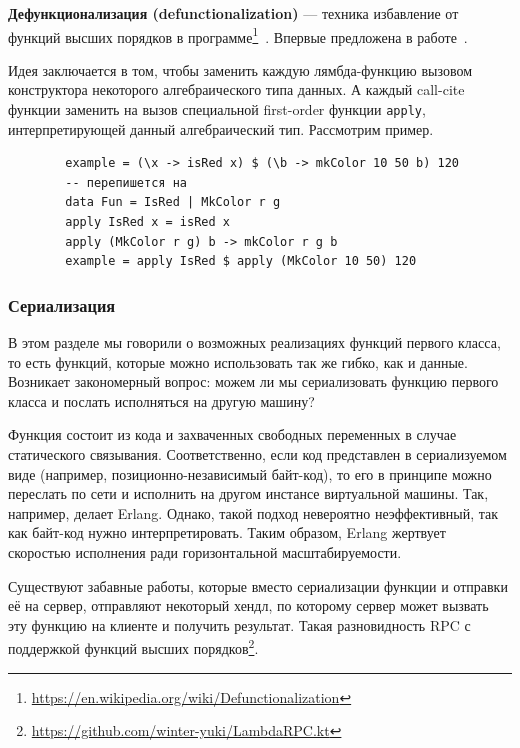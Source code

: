 \documentclass[12pt]{article}
\newcommand{\vocab}[1]{\textbf{#1}} %
\begin{document}
    \vocab{Дефункционализация (defunctionalization)} --- техника избавление от функций высших порядков в программе\footnote{\url{https://en.wikipedia.org/wiki/Defunctionalization}}~\cite{defunctionalization-slides}.
    Впервые предложена в работе~\cite{reynolds1972definitional, reynolds1998definitional}.

    Идея заключается в том, чтобы заменить каждую лямбда-функцию вызовом конструктора некоторого алгебраического типа данных.
    А каждый call-cite функции заменить на вызов специальной first-order функции \texttt{apply}, интерпретирующей данный алгебраический тип.
    Рассмотрим пример.

    \begin{verbatim}
        example = (\x -> isRed x) $ (\b -> mkColor 10 50 b) 120
        -- перепишется на
        data Fun = IsRed | MkColor r g
        apply IsRed x = isRed x
        apply (MkColor r g) b -> mkColor r g b
        example = apply IsRed $ apply (MkColor 10 50) 120
    \end{verbatim}

    \subsubsection{Сериализация}

    В этом разделе мы говорили о возможных реализациях функций первого класса, то есть функций, которые можно использовать так же гибко, как и данные.
    Возникает закономерный вопрос: можем ли мы сериализовать функцию первого класса и послать исполняться на другую машину?

    Функция состоит из кода и захваченных свободных переменных в случае статического связывания.
    Соответственно, если код представлен в сериализуемом виде (например, позиционно-независимый байт-код), то его в принципе можно переслать по сети и исполнить на другом инстансе виртуальной машины.
    Так, например, делает Erlang.
    Однако, такой подход невероятно неэффективный, так как байт-код нужно интерпретировать.
    Таким образом, Erlang жертвует скоростью исполнения ради горизонтальной масштабируемости.

    Существуют забавные работы, которые вместо сериализации функции и отправки её на сервер, отправляют некоторый хендл, по которому сервер может вызвать эту функцию на клиенте и получить результат.
    Такая разновидность RPC с поддержкой функций высших порядков\footnote{\url{https://github.com/winter-yuki/LambdaRPC.kt}}.
\end{document}
